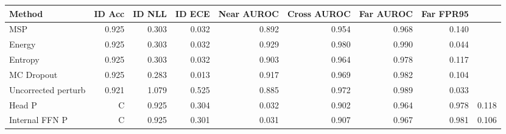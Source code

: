 \begin{tabular}{lrrrrrrr}
Method & ID Acc & ID NLL & ID ECE & Near AUROC & Cross AUROC & Far AUROC & Far FPR95 \\
\hline
MSP & 0.925 & 0.303 & 0.032 & 0.892 & 0.954 & 0.968 & 0.140 \\
Energy & 0.925 & 0.303 & 0.032 & 0.929 & 0.980 & 0.990 & 0.044 \\
Entropy & 0.925 & 0.303 & 0.032 & 0.903 & 0.964 & 0.978 & 0.117 \\
MC Dropout & 0.925 & 0.283 & 0.013 & 0.917 & 0.969 & 0.982 & 0.104 \\
Uncorrected perturb & 0.921 & 1.079 & 0.525 & 0.885 & 0.972 & 0.989 & 0.033 \\
Head P&C & 0.925 & 0.304 & 0.032 & 0.902 & 0.964 & 0.978 & 0.118 \\
Internal FFN P&C & 0.925 & 0.301 & 0.031 & 0.907 & 0.967 & 0.981 & 0.106 \\
\end{tabular}
